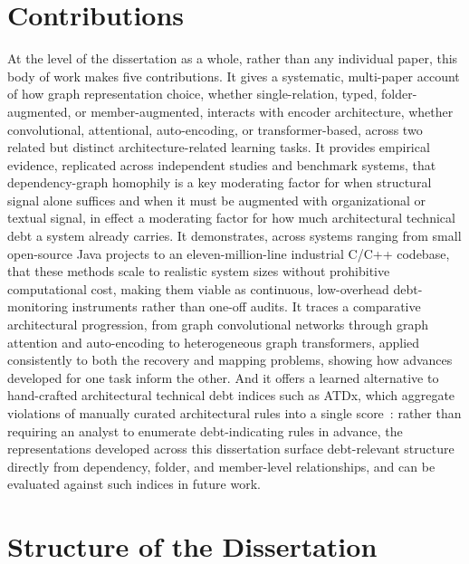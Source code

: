 \section{Contributions}
\label{sec:contributions}

At the level of the dissertation as a whole, rather than any individual paper, this body of work makes five contributions. It gives a systematic, multi-paper account of how graph representation choice, whether single-relation, typed, folder-augmented, or member-augmented, interacts with encoder architecture, whether convolutional, attentional, auto-encoding, or transformer-based, across two related but distinct architecture-related learning tasks. It provides empirical evidence, replicated across independent studies and benchmark systems, that dependency-graph homophily is a key moderating factor for when structural signal alone suffices and when it must be augmented with organizational or textual signal, in effect a moderating factor for how much architectural technical debt a system already carries. It demonstrates, across systems ranging from small open-source Java projects to an eleven-million-line industrial C/C++ codebase, that these methods scale to realistic system sizes without prohibitive computational cost, making them viable as continuous, low-overhead debt-monitoring instruments rather than one-off audits. It traces a comparative architectural progression, from graph convolutional networks through graph attention and auto-encoding to heterogeneous graph transformers, applied consistently to both the recovery and mapping problems, showing how advances developed for one task inform the other. And it offers a learned alternative to hand-crafted architectural technical debt indices such as ATDx, which aggregate violations of manually curated architectural rules into a single score~\citep{verdecchia2020atdx}: rather than requiring an analyst to enumerate debt-indicating rules in advance, the representations developed across this dissertation surface debt-relevant structure directly from dependency, folder, and member-level relationships, and can be evaluated against such indices in future work.

\section{Structure of the Dissertation}
\label{sec:structure}


